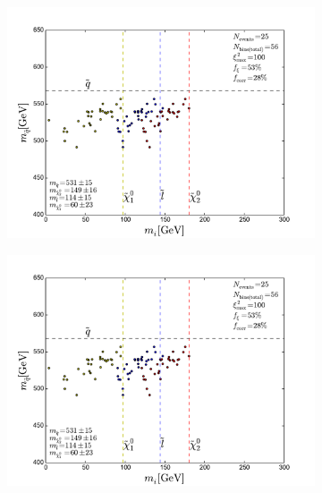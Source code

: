 \documentclass[twoside,english]{uiofysmaster}
\begin{document}
\begin{figure}[hbt]
	\centering
	\begin{subfigure}[b]{0.45\textwidth}
		\includegraphics[width=\textwidth]{figures/improving_combinatorics/herwigpp-MD-dileptonedge-fit-comb-nosmear-cut100_TMP.pdf} 
		\caption{ }
	\end{subfigure}
	\begin{subfigure}[b]{0.45\textwidth}
		\includegraphics[width=\textwidth]{figures/improving_combinatorics/herwigpp-MD-dileptonedge-fit-comb-nosmear-cut100_400-300-200-100.pdf}
		\caption{ } 
	\end{subfigure}


\end{figure}
\end{document}
